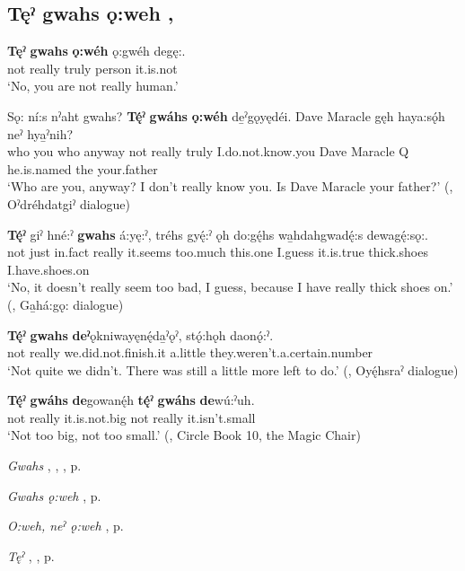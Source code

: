 \subsection*{\textbf{Tęˀ gwahs ǫ:weh} , } \label{p:[tęˀ gwahs ǫ:weh]}

\ea
\label{ex:tpart36}
\gll \textbf{Tęˀ} \textbf{gwahs} \textbf{ǫ:wéh} ǫ:gwéh degę:.\\
not really truly person it.is.not\\
\glt ‘No, you are not really human.’
\z

\ea
\label{ex:tpart37}
\gll Sǫ: ní:s nˀaht gwahs? \textbf{Tę́ˀ} \textbf{gwáhs} \textbf{ǫ:wéh} de̱ˀgǫyędéi. Dave Maracle gęh haya:sǫ́h neˀ hya̱ˀnih?\\
who you who anyway not really truly I.do.not.know.you Dave Maracle Q he.is.named the your.father\\
\glt ‘Who are you, anyway? I don’t really know you. Is Dave Maracle your father?’ (\cite[339]{mithun_watewayestanih_1984}, Oˀdréhdatgiˀ dialogue)
\z

\ea
\label{ex:tpart38}
\gll \textbf{Tę́ˀ} giˀ hné:ˀ \textbf{gwahs} á:yę:ˀ, tréhs gyę́:ˀ ǫh do:gę́hs wa̱hdahgwadę́:s dewagę́:sǫ:.\\
not just in.fact really it.seems too.much this.one I.guess it.is.true thick.shoes I.have.shoes.on\\
\glt ‘No, it doesn’t really seem too bad, I guess, because I have really thick shoes on.’ (\cite[386]{mithun_watewayestanih_1984}, Ga̱há:gǫ: dialogue)
\z

\ea
\label{ex:tpart39}
\gll \textbf{Tę́ˀ} \textbf{gwahs} \textbf{deˀ}ǫkniwayęnę́da̱ˀǫˀ, stǫ́:hǫh daonǫ́:ˀ⁠. \\
not really we.did.not.finish.it a.little they.weren’t.a.certain.number\\
\glt ‘Not quite we didn’t. There was still a little more left to do.’ (\cite[456]{mithun_watewayestanih_1984}, Oyę́hsraˀ dialogue)
\z

\ea
\label{ex:tpart40}
\gll \textbf{Tę́ˀ} \textbf{gwáhs} \textbf{de}gowanę́h \textbf{tę́ˀ} \textbf{gwáhs} \textbf{de}wú:ˀuh.\\
not really it.is.not.big not really it.isn’t.small\\
\glt ‘Not too big, not too small.’ (\cite{keye_circle_2016}, Circle Book 10, the Magic Chair)
\z

\begin{CayugaRelated}
\item \textit{Gwahs} , , , p. \pageref{p:[gwahs] ‘really’}\\
\item \textit{Gwahs ǫ:weh} , p. \pageref{p:[gwahs ǫ:weh]}\\
\item \textit{O:weh, neˀ ǫ:weh} , p. \pageref{p:[ǫ:weh, neˀ ǫ:weh]}\\
\item \textit{Tęˀ} , , p. \pageref{p:[tęˀ]}
\end{CayugaRelated}


